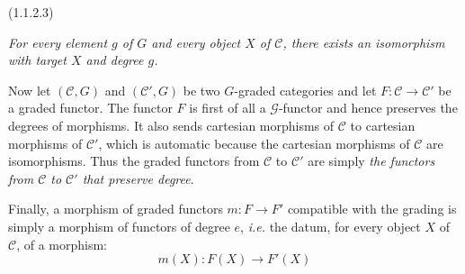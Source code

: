 \noindent\textnormal{(1.1.2.3)}\quad
\begin{minipage}[t]{0.78\textwidth}
\emph{For every element $g$ of $G$ and every object $X$ of $\mathcal C$,
there exists an isomorphism with target $X$ and degree $g$.}
\end{minipage}
\par\medskip

Now let $(\mathcal C,G)$ and $(\mathcal C',G)$ be two $G$-graded
categories and let $F\colon\mathcal C\to\mathcal C'$ be a graded functor.
The functor $F$ is first of all a $\mathcal G$-functor and hence preserves
the degrees of morphisms. It also sends cartesian morphisms of $\mathcal C$
to cartesian morphisms of $\mathcal C'$, which is automatic because the
cartesian morphisms of $\mathcal C$ are isomorphisms. Thus the graded
functors from $\mathcal C$ to $\mathcal C'$ are simply
\emph{the functors from $\mathcal C$ to $\mathcal C'$ that preserve
degree}.

Finally, a morphism of graded functors $m\colon F\to F'$ compatible with
the grading is simply a morphism of functors of degree $e$, \emph{i.e.}
the datum, for every object $X$ of $\mathcal C$, of a morphism:
\[
  m(X)\colon F(X)\longrightarrow F'(X)
\]
